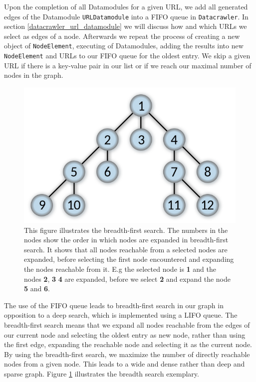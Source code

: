 Upon the completion of all Datamodules for a given URL, we add all generated edges of the Datamodule \texttt{URLDatamodule} into a FIFO queue in \texttt{Datacrawler}. In section \ref{datacrawler_url_datamodule} we will discuss how and which URLs we select as edges of a node. Afterwards we repeat the process of creating a new object of \texttt{NodeElement}, executing of Datamodules, adding the results into new \texttt{NodeElement} and URLs to our FIFO queue for the oldest entry. We skip a given URL if there is a key-value pair in our list or if we reach our maximal number of nodes in the graph. 

\begin{figure}
	\centering
	\includegraphics[scale=0.35]{resources/breadth-first}
	\caption{This figure illustrates the breadth-first search. The numbers in the nodes show the order in which nodes are expanded in breadth-first search. It shows that all nodes reachable from a selected nodes are expanded, before selecting the first node encountered and expanding the nodes reachable from it. E.g the selected node is \textbf{1} and the nodes \textbf{2}, \textbf{3} \textbf{4} are expanded, before we select \textbf{2} and expand the node \textbf{5} and \textbf{6}.}
	\label{datacrawler_breadth_search}
\end{figure}

The use of the FIFO queue leads to breadth-first search in our graph in opposition to a deep search, which is implemented using a LIFO queue. The breadth-first search means that we expand all nodes reachable from the edges of our current node and selecting the oldest entry as new node, rather than using the first edge, expanding the reachable node and selecting it as the current node. By using the breadth-first search, we maximize the number of directly reachable nodes from a given node. This leads to a wide and dense rather than deep and sparse graph.  Figure \ref{datacrawler_breadth_search} illustrates the breadth search exemplary.

